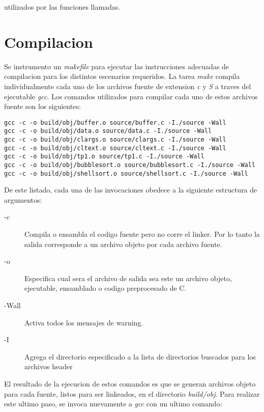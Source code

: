 \documentclass[a4paper,11pt]{article}
\begin{document}
utilizados por las funciones llamadas.

\FloatBarrier

\section{Compilacion}

Se instrumento un \textit{makefile} para ejecutar las instrucciones adecuadas
de compilacion para los distintos escenarios requeridos. La
tarea \textit{make} compila individualmente cada uno de los archivos fuente de
extension \textit{c} y \textit{S} a traves del ejecutable \textit{gcc}.
Los comandos utilizados para compilar cada uno de estos archivos fuente son los
siguientes:

\begin{lstlisting}
gcc -c -o build/obj/buffer.o source/buffer.c -I./source -Wall 
gcc -c -o build/obj/data.o source/data.c -I./source -Wall 
gcc -c -o build/obj/clargs.o source/clargs.c -I./source -Wall 
gcc -c -o build/obj/cltext.o source/cltext.c -I./source -Wall 
gcc -c -o build/obj/tp1.o source/tp1.c -I./source -Wall 
gcc -c -o build/obj/bubblesort.o source/bubblesort.c -I./source -Wall 
gcc -c -o build/obj/shellsort.o source/shellsort.c -I./source -Wall 
\end{lstlisting}

De este listado, cada una de las invocaciones obedece a la siguiente estructura
de argumentos:

\begin{description}

  \item[-c] Compila o ensambla el codigo fuente pero no corre el linker.  Por
    lo tanto la salida corresponde a un archivo objeto por cada archivo fuente.

  \item[-o] Especifica cual sera el archivo de salida sea este un archivo
    objeto, ejecutable, ensamblado o codigo preprocesado de C.

  \item[-Wall] Activa todos los mensajes de warning.

  \item[-I] Agrega el directorio especificado a la lista de directorios
    buscados para los archivos header

\end{description}

El resultado de la ejecucion de estos comandos es que se generan archivos
objeto para cada fuente, listos para ser linkeados, en el directorio
\textit{build/obj}. Para realizar este ultimo paso, se invoca nuevamente a
\textit{gcc} con un ultimo comando:
\end{document}
